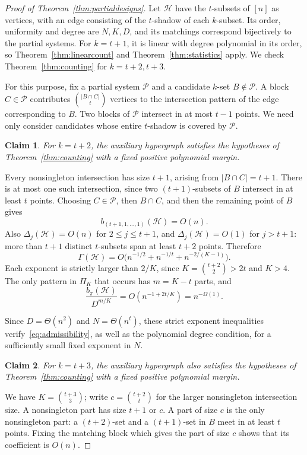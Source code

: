 \documentclass[11pt,reqno]{amsart}
\makeatletter
\numberwithin{equation}{section}
\theoremstyle{plain}
\newtheorem{claim}{Claim}[section]
\newenvironment{claimproof}[1][Proof]{\par
    \pushQED{\qed}%
    \renewcommand{\qedsymbol}{$\blacksquare$}
    \normalfont \topsep6\p@\@plus6\p@\relax
    \trivlist
    \item[\hskip\labelsep
    \textit{#1}\@addpunct{.}~]\ignorespaces
}{%
    \popQED\endtrivlist\@endpefalse
}
\theoremstyle{definition}
\newcommand{\calH}{\mathcal{H}}
\newcommand{\calP}{\mathcal{P}}
\makeatother
\begin{document}
\begin{proof}[Proof of Theorem~\ref{thm:partialdesigns}]
    Let $\calH$ have the $t$-subsets of $[n]$ as vertices, with an edge consisting of the $t$-shadow of each $k$-subset.
    Its order, uniformity and degree are $N,K,D$, and its matchings correspond bijectively to the partial systems.
    For $k=t+1$, it is linear with degree polynomial in its order, so Theorem~\ref{thm:linearcount} and Theorem~\ref{thm:statistics} apply.
    We check Theorem~\ref{thm:counting} for $k=t+2,t+3$.

    For this purpose, fix a partial system $\calP$ and a candidate $k$-set $B\notin\calP$.
    A block $C\in\calP$ contributes $\binom{|B\cap C|}{t}$ vertices to the intersection pattern of the edge corresponding to $B$.
    Two blocks of $\calP$ intersect in at most $t-1$ points.
    We need only consider candidates whose entire $t$-shadow is covered by $\calP$.

    \begin{claim}\label{clm:set-design-two}
        For $k=t+2$, the auxiliary hypergraph satisfies the hypotheses of Theorem~\ref{thm:counting} with a fixed positive polynomial margin.
    \end{claim}
    \begin{claimproof}[Proof of Claim~\ref{clm:set-design-two}]
    Every nonsingleton intersection has size $t+1$, arising from $|B\cap C|=t+1$.
    There is at most one such intersection, since two $(t+1)$-subsets of $B$ intersect in at least $t$ points.
    Choosing $C\in\calP$, then $B\cap C$, and then the remaining point of $B$ gives
    \[
        b_{(t+1,1,\ldots,1)}(\calH)=O(n).
    \]
    Also $\Delta_j(\calH)=O(n)$ for $2\le j\le t+1$, and $\Delta_j(\calH)=O(1)$ for $j>t+1$: more than $t+1$ distinct $t$-subsets span at least $t+2$ points.
    Therefore
    \[
        \Gamma(\calH)=O\bigl(n^{-1/2}+n^{-1/t}+n^{-2/(K-1)}\bigr).
    \]
    Each exponent is strictly larger than $2/K$, since $K=\binom{t+2}2>2t$ and $K>4$.
    The only pattern in $\Pi_K$ that occurs has $m=K-t$ parts, and
    \[
        \frac{b_\pi(\calH)}{D^{m/K}}=O(n^{-1+2t/K})=n^{-\Omega(1)}.
    \]

    Since $D=\Theta(n^2)$ and $N=\Theta(n^t)$, these strict exponent inequalities verify~\eqref{eq:admissibility}, as well as the polynomial degree condition, for a sufficiently small fixed exponent in $N$.
    \end{claimproof}

    \begin{claim}\label{clm:set-design-three}
        For $k=t+3$, the auxiliary hypergraph also satisfies the hypotheses of Theorem~\ref{thm:counting} with a fixed positive polynomial margin.
    \end{claim}
    \begin{claimproof}[Proof of Claim~\ref{clm:set-design-three}]
    We have $K=\binom{t+3}3$; write $c=\binom{t+2}t$ for the larger nonsingleton intersection size.
    A nonsingleton part has size $t+1$ or $c$.
    A part of size $c$ is the only nonsingleton part: a $(t+2)$-set and a $(t+1)$-set in $B$ meet in at least $t$ points.
    Fixing the matching block which gives the part of size $c$ shows that its coefficient is $O(n)$.


\end{claimproof}
\end{proof}
\end{document}
